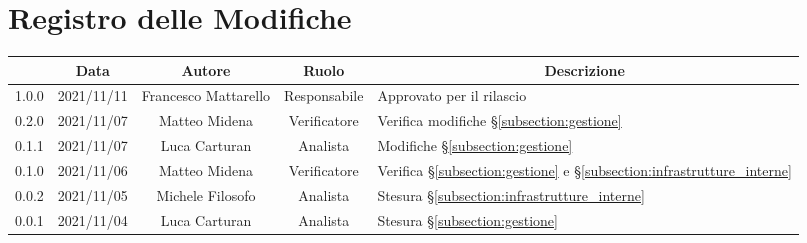\thispagestyle{empty}
\section*{Registro delle Modifiche}

\begin{center}
	\renewcommand{\arraystretch}{1.8}
	\begin{longtable}[c]{c | c | c | c | p{5cm}}
		\rowcolor[HTML]{125E28}
		\multicolumn{1}{c}{\color[HTML]{FFFFFF} \textbf{Versione}} & 
		\multicolumn{1}{c}{\color[HTML]{FFFFFF} \textbf{Data}} & 
		\multicolumn{1}{c}{\color[HTML]{FFFFFF} \textbf{Autore}} & 
		\multicolumn{1}{c}{\color[HTML]{FFFFFF} \textbf{Ruolo}} & 
		\multicolumn{1}{c}{\color[HTML]{FFFFFF} \textbf{Descrizione}} \\
		\endhead
		1.0.0 & 2021/11/11 & Francesco Mattarello & Responsabile & Approvato per il rilascio\\
		0.2.0 & 2021/11/07 & Matteo Midena & Verificatore & Verifica modifiche §\ref{subsection:gestione}\\
		0.1.1 & 2021/11/07 & Luca Carturan & Analista & Modifiche §\ref{subsection:gestione}\\
		0.1.0 & 2021/11/06 & Matteo Midena & Verificatore & Verifica  §\ref{subsection:gestione} e  §\ref{subsection:infrastrutture_interne}\\
		0.0.2 & 2021/11/05 & Michele Filosofo & Analista & Stesura §\ref{subsection:infrastrutture_interne}\\
		0.0.1 & 2021/11/04 & Luca Carturan & Analista &Stesura §\ref{subsection:gestione}  \\

	\end{longtable}
\end{center}